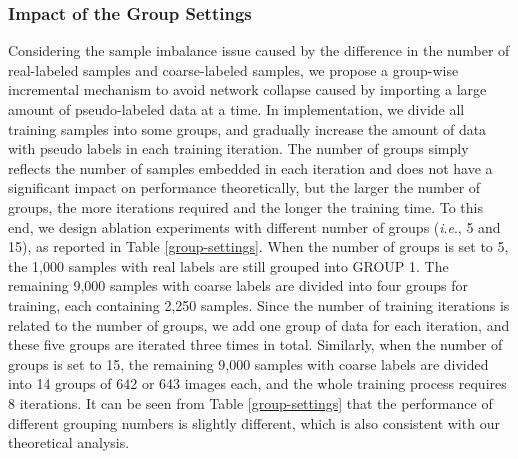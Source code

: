 \documentclass[journal]{IEEEtran}
\newcommand{\ie}{\textit{i}.\textit{e}.}
\begin{document}
\subsubsection{Impact of the Group Settings}
Considering the sample imbalance issue caused by the difference in the number of real-labeled samples and coarse-labeled samples, we propose a group-wise incremental mechanism to avoid network collapse caused by importing a large amount of pseudo-labeled data at a time. In implementation, we divide all training samples into some groups, and gradually increase the amount of data with pseudo labels in each training iteration. The number of groups simply reflects the number of samples embedded in each iteration and does not have a significant impact on performance theoretically, but the larger the number of groups, the more iterations required and the longer the training time. To this end, we design ablation experiments with different number of groups (\ie, 5 and 15), as reported in Table \ref{group-settings}. When the number of groups is set to 5, the 1,000 samples with real labels are still grouped into GROUP 1. The remaining 9,000 samples with coarse labels are divided into four groups for training, each containing 2,250 samples. Since the number of training iterations is related to the number of groups, we add one group of data for each iteration, and these five groups are iterated three times in total. Similarly, when the number of groups is set to 15, the remaining 9,000 samples with coarse labels are divided into 14 groups of 642 or 643 images each, and the whole training process requires 8 iterations. It can be seen from Table \ref{group-settings} that the performance of different grouping numbers is slightly different, which is also consistent with our theoretical analysis.


\begin{table}[!t]
\centering
\small
\renewcommand\arraystretch{1.5}
    \begin{spacing}{1}
    \caption{Ablation study of Different Group Settings.}
    \label{group-settings}
    \end{spacing}
\end{table}
\end{document}
